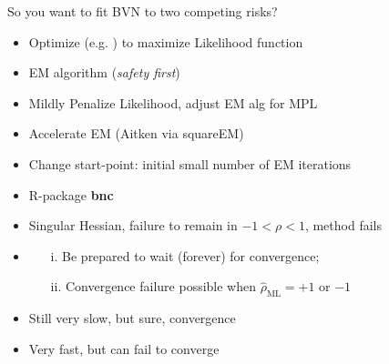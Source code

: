 \documentclass[10pt]{beamer}
\providecommand{\tightlist}{%
\setlength{\itemsep}{0pt}\setlength{\parskip}{0pt}}
\begin{document}
\begin{frame}[fragile]{So you want to fit BVN to two competing risks?}
\protect\hypertarget{so-you-want-to-fit-bvn-to-two-competing-risks}{}
\begin{itemize}
\tightlist
\item<1->
  Optimize (e.g. ) to maximize Likelihood function
  \item<2-> EM algorithm (\emph{safety first}) 
  \item<3-> Mildly
Penalize Likelihood, adjust EM alg for MPL
  \item<4-> Accelerate EM (Aitken via squareEM)
  \item<5-> Change start-point: initial small number of
EM iterations 
  \item<6-> R-package \textbf{bnc}
\end{itemize}

\begin{itemize}
\item<1> Singular Hessian, failure to remain in $-1 < \rho < 1$, method fails 
\item<2>
  \begin{enumerate}
  \item[i.] Be prepared to wait (forever) for convergence;
  \item[ii.] Convergence failure possible when $\hat{\rho}_{\mbox{ML}} = +1$ or $-1$
  \end{enumerate}
\item<3> Still very slow, but sure, convergence
\item<4> Very fast, but can fail to converge
\end{itemize}
\end{frame}
\end{document}
